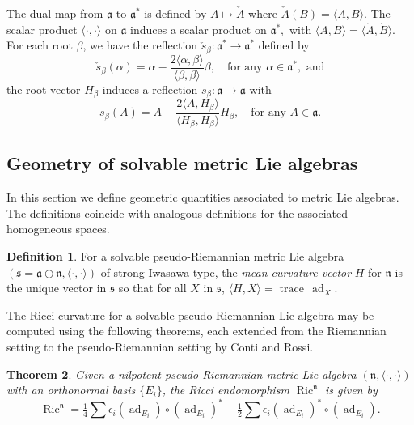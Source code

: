 \documentclass[12pt]{amsart}
\newcommand{\la}{\langle}
\newcommand{\ra}{\rangle}
\newcommand{\fraka}{\ensuremath{\mathfrak{a}} }
\newcommand{\frakn}{\ensuremath{\mathfrak{n}} }
\newcommand{\fraks}{\ensuremath{\mathfrak{s}} }
\renewcommand\a{{\mathfrak{a}}}
\newcommand\n{{\mathfrak{n}}}
\newcommand\s{{\mathfrak{s}}}
\newcommand\ip{{\langle\cdot {,} \cdot\rangle}}
\newcommand\tr{\operatorname{trace}}
\newcommand\ad{\operatorname{ad}}
\newcommand{\Ric}{\operatorname{Ric}}
\theoremstyle{plain}
\newtheorem{theorem}{Theorem}
\theoremstyle{definition}
\newtheorem{defn}[theorem]{Definition}
\theoremstyle{remark}
\numberwithin{equation}{section}
\numberwithin{theorem}{section}
\begin{document}
  The dual map from $\fraka$ to $\fraka^*$ is defined by $ A \mapsto \check{A}$ where 
  $\check{A} (B) = \la A , B \ra$. 
The scalar product $\ip$ on $\fraka$ induces a scalar product on $\fraka^\ast,$ with $\la  A,B \ra = \la
 \check{A}, \check{B} \ra.$  For each  root
$\beta$, we have the reflection 
$\check{s}_{\beta} : \a^* \to \a^\ast$ defined by
 \[ \check{s}_{\beta} ( \alpha ) = \alpha  - \frac{2\la  \alpha,\beta
     \ra}{\la \beta, \beta  \ra}  \beta, \quad \text{for any $\alpha
     \in\fraka^\ast,$ and}   \]
the root vector $H_\beta$ induces a reflection $s_{\beta}: \fraka \to \fraka$ with
      \[ s_{\beta} (A) = A -  \frac{2 \la A, H_{\beta}\ra}{\la
          H_{\beta}, H_{\beta} \ra }  H_{\beta},\quad  \text{for any $A \in\fraka.$} 
      \]
\subsection{Geometry of  solvable metric Lie algebras}\label{sec: Ricci solv}

In this section we define geometric quantities associated to metric
Lie algebras. The definitions coincide with analogous definitions for
the associated homogeneous spaces.
\begin{defn}\label{defn: mean curvature} 
For a solvable pseudo-Riemannian metric Lie algebra $(\fraks=\fraka \oplus \frakn,\ip)$ 
of strong Iwasawa type, the {\em mean curvature vector} $H$ for $\frakn$ is
the unique vector in $\fraks$ so that for all $X$ in $\s$,
$\langle H,X\rangle =\tr\,\ad_X$. 
\end{defn}  
The Ricci curvature  for a solvable pseudo-Riemannian  Lie
algebra may be computed using the following theorems, each extended 
from the Riemannian setting to the pseudo-Riemannian setting by Conti and Rossi.  

\begin{theorem}\label{Alekseevskii}\cite{alekseevski-75,conti-rossi-19}
  Given a nilpotent pseudo-Riemannian  metric Lie algebra  $(\n, \ip)$  with an orthonormal basis $\{E_i\}$,
the Ricci  endomorphism $\Ric^{\n}$ is given by
 \begin{equation}\label{eqn: ricci-nilpotent}\Ric^{\n} = \tfrac 14 \sum \epsilon_i (\ad_{E_i}) \circ (\ad_{E_i})^* - \tfrac 12 \sum \epsilon_i (\ad_{E_i})^* \circ (\ad_{E_i}).\end{equation}
  \end{theorem}
 
\end{document}
